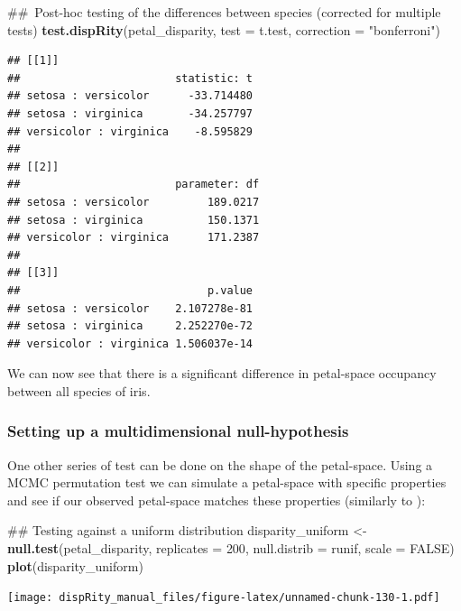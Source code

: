 \documentclass[]{book}
\newenvironment{Shaded}{\begin{snugshade}}{\end{snugshade}}
\newcommand{\KeywordTok}[1]{\textcolor[rgb]{0.13,0.29,0.53}{\textbf{#1}}}
\newcommand{\DataTypeTok}[1]{\textcolor[rgb]{0.13,0.29,0.53}{#1}}
\newcommand{\DecValTok}[1]{\textcolor[rgb]{0.00,0.00,0.81}{#1}}
\newcommand{\StringTok}[1]{\textcolor[rgb]{0.31,0.60,0.02}{#1}}
\newcommand{\OtherTok}[1]{\textcolor[rgb]{0.56,0.35,0.01}{#1}}
\newcommand{\NormalTok}[1]{#1}
\theoremstyle{definition}
\theoremstyle{definition}
\theoremstyle{definition}
\theoremstyle{remark}
\begin{document}
\begin{Shaded}
\begin{Highlighting}[]
\NormalTok{## Post-hoc testing of the differences between species (corrected for multiple tests)}
\KeywordTok{test.dispRity}\NormalTok{(petal_disparity, }\DataTypeTok{test =}\NormalTok{ t.test, }\DataTypeTok{correction =} \StringTok{"bonferroni"}\NormalTok{)}
\end{Highlighting}
\end{Shaded}

\begin{verbatim}
## [[1]]
##                        statistic: t
## setosa : versicolor      -33.714480
## setosa : virginica       -34.257797
## versicolor : virginica    -8.595829
## 
## [[2]]
##                        parameter: df
## setosa : versicolor         189.0217
## setosa : virginica          150.1371
## versicolor : virginica      171.2387
## 
## [[3]]
##                             p.value
## setosa : versicolor    2.107278e-81
## setosa : virginica     2.252270e-72
## versicolor : virginica 1.506037e-14
\end{verbatim}

We can now see that there is a significant difference in petal-space
occupancy between all species of iris.

\subsubsection{Setting up a multidimensional
null-hypothesis}\label{setting-up-a-multidimensional-null-hypothesis}

One other series of test can be done on the shape of the petal-space.
Using a MCMC permutation test we can simulate a petal-space with
specific properties and see if our observed petal-space matches these
properties (similarly to \citet{diaz2016global}):

\begin{Shaded}
\begin{Highlighting}[]
\NormalTok{## Testing against a uniform distribution}
\NormalTok{disparity_uniform <-}\StringTok{ }\KeywordTok{null.test}\NormalTok{(petal_disparity, }\DataTypeTok{replicates =} \DecValTok{200}\NormalTok{,}
    \DataTypeTok{null.distrib =}\NormalTok{ runif, }\DataTypeTok{scale =} \OtherTok{FALSE}\NormalTok{)}
\KeywordTok{plot}\NormalTok{(disparity_uniform)}
\end{Highlighting}
\end{Shaded}

\texttt{[image: dispRity\_manual\_files/figure-latex/unnamed-chunk-130-1.pdf]}
\end{document}
